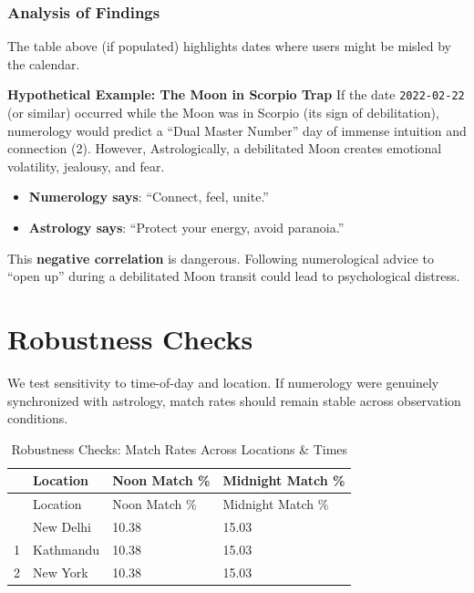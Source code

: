 \documentclass[
  11pt,
  a4paper,
  oneside,
  openany]{report}
\providecommand{\tightlist}{%
  \setlength{\itemsep}{0pt}\setlength{\parskip}{0pt}}\usepackage{longtable,booktabs,array}
\begin{document}
\subsection{Analysis of Findings}\label{analysis-of-findings}

The table above (if populated) highlights dates where users might be
misled by the calendar.

\textbf{Hypothetical Example: The Moon in Scorpio Trap} If the date
\texttt{2022-02-22} (or similar) occurred while the Moon was in Scorpio
(its sign of debilitation), numerology would predict a ``Dual Master
Number'' day of immense intuition and connection (2). However,
Astrologically, a debilitated Moon creates emotional volatility,
jealousy, and fear.

\begin{itemize}
\tightlist
\item
  \textbf{Numerology says}: ``Connect, feel, unite.''
\item
  \textbf{Astrology says}: ``Protect your energy, avoid paranoia.''
\end{itemize}

This \textbf{negative correlation} is dangerous. Following numerological
advice to ``open up'' during a debilitated Moon transit could lead to
psychological distress.

\chapter{Robustness Checks}\label{robustness-checks}

We test sensitivity to time-of-day and location. If numerology were
genuinely synchronized with astrology, match rates should remain stable
across observation conditions.

\label{robustness}
\begin{longtable}[]{@{}llll@{}}
\caption{Robustness Checks: Match Rates Across Locations \&
Times}\tabularnewline
\toprule\noalign{}
& Location & Noon Match \% & Midnight Match \% \\
\midrule\noalign{}
\endfirsthead
\toprule\noalign{}
& Location & Noon Match \% & Midnight Match \% \\
\midrule\noalign{}
\endhead
\bottomrule\noalign{}
\endlastfoot
0 & New Delhi & 10.38 & 15.03 \\
1 & Kathmandu & 10.38 & 15.03 \\
2 & New York & 10.38 & 15.03 \\
\end{longtable}
\end{document}
